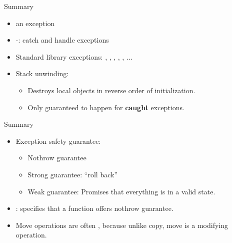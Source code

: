 \documentclass[aspectratio=169]{beamer}
\begin{document}
\begin{frame}{Summary}
  \begin{itemize}
    \item {} an exception
    \item {}-: catch and handle exceptions
    \item Standard library exceptions: , , , , , ...
    \item Stack unwinding:
    \begin{itemize}
      \item Destroys local objects in reverse order of initialization.
      \item Only guaranteed to happen for \textbf{caught} exceptions.
    \end{itemize}
  \end{itemize}
\end{frame}

\begin{frame}{Summary}
  \begin{itemize}
    \item Exception safety guarantee:
    \begin{itemize}
      \item Nothrow guarantee
      \item Strong guarantee: ``roll back''
      \item Weak guarantee: Promises that everything is in a valid state.
    \end{itemize}
    \item {}: specifies that a function offers nothrow guarantee.
    \item Move operations are often , because unlike copy, move is a modifying operation.
  \end{itemize}
\end{frame}
\end{document}
